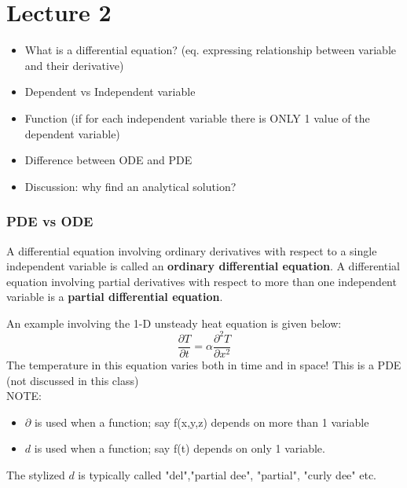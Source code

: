 \chapter*{Lecture 2}
\begin{recall}{}{}
\begin{itemize}
\item What is a differential equation? (eq. expressing relationship between variable and their derivative)
\item Dependent vs Independent variable
\item Function (if for each independent variable there is ONLY 1 value of the dependent variable)
\item Difference between ODE and PDE
\item Discussion: why find an analytical solution?
\end{itemize}
\end{recall}



\subsection*{PDE vs ODE}
A differential equation involving ordinary derivatives with respect to a single independent variable is called an \textbf{ordinary differential equation}. A differential equation involving partial derivatives with respect to more than one independent variable is a \textbf{partial differential equation}.

\begin{exmp}{}
An example involving the 1-D unsteady heat equation is given below:
\begin{equation}
\frac{\partial T}{\partial t}=\alpha \frac{\partial^2 T}{\partial x^2}
\end{equation}
The temperature in this equation varies both in time and in space! This is a PDE (not discussed in this class)\\
NOTE:
\begin{itemize}
\item $\partial$  is used when a function; say f(x,y,z) depends on more than 1 variable
\item $d$ is used when a function; say f(t) depends on only 1 variable.
\end{itemize}
The stylized $d$ is typically called "del","partial dee", "partial", "curly dee" etc.
\end{exmp}



